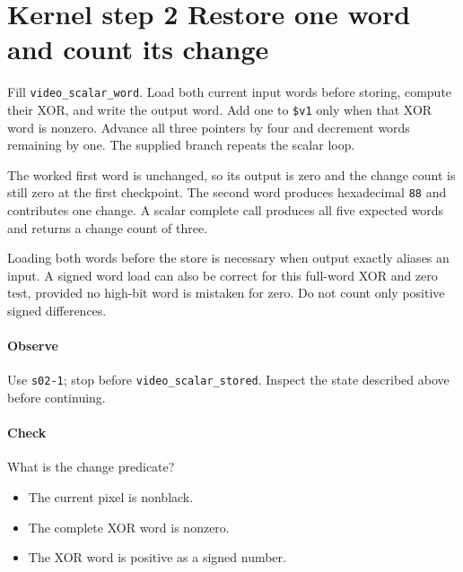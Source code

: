 \section{Kernel step 2 Restore one word and count its change}
Fill \texttt{video\_scalar\_word}. Load both current input words before storing, compute their XOR, and write the output word. Add one to \texttt{\$v1} only when that XOR word is nonzero. Advance all three pointers by four and decrement words remaining by one. The supplied branch repeats the scalar loop.

The worked first word is unchanged, so its output is zero and the change count is still zero at the first checkpoint. The second word produces hexadecimal \texttt{88} and contributes one change. A scalar complete call produces all five expected words and returns a change count of three.

Loading both words before the store is necessary when output exactly aliases an input. A signed word load can also be correct for this full-word XOR and zero test, provided no high-bit word is mistaken for zero. Do not count only positive signed differences.

\paragraph{Observe} Use \texttt{s02-1}; stop before \texttt{video\_scalar\_stored}. Inspect the state described above before continuing.

\paragraph{Check} What is the change predicate?
\begin{itemize}
  \item[A.] The current pixel is nonblack.
  \item[B.] The complete XOR word is nonzero.
  \item[C.] The XOR word is positive as a signed number.
\end{itemize}
